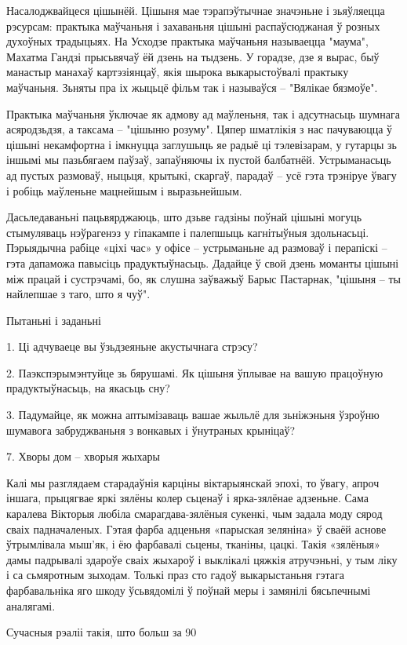 Насалоджвайцеся цішынёй. Цішыня мае тэрапэўтычнае значэньне і зьяўляецца рэсурсам: практыка маўчаньня і захаваньня цішыні распаўсюджаная ў розных духоўных традыцыях. На Усходзе практыка маўчаньня называецца "маума", Махатма Гандзі прысьвячаў ёй дзень на тыдзень. У горадзе, дзе я вырас, быў манастыр манахаў картэзіянцаў, якія шырока выкарыстоўвалі практыку маўчаньня. Зьняты пра іх жыцьцё фільм так і называўся – "Вялікае бязмоўе".

Практыка маўчаньня ўключае як адмову ад маўленьня, так і адсутнасьць шумнага асяродзьдзя, а таксама – "цішыню розуму". Цяпер шматлікія з нас пачуваюцца ў цішыні некамфортна і імкнуцца заглушыць яе радыё ці тэлевізарам, у гутарцы зь іншымі мы пазьбягаем паўзаў, запаўняючы іх пустой балбатнёй. Устрыманасьць ад пустых размоваў, ныцьця, крытыкі, скаргаў, парадаў – усё гэта трэніруе ўвагу і робіць маўленьне мацнейшым і выразьнейшым.

Дасьледаваньні пацьвярджаюць, што дзьве гадзіны поўнай цішыні могуць стымуляваць нэўрагенэз у гіпакампе і палепшыць кагнітыўныя здольнасьці. Пэрыядычна рабіце «ціхі час» у офісе – устрыманьне ад размоваў і перапіскі – гэта дапаможа павысіць прадуктыўнасьць. Дадайце ў свой дзень моманты цішыні між працай і сустрэчамі, бо, як слушна заўважыў Барыс Пастарнак, "цішыня – ты найлепшае з таго, што я чуў".

Пытаньні і заданьні

1. Ці адчуваеце вы ўзьдзеяньне акустычнага стрэсу?

2. Паэкспэрымэнтуйце зь бярушамі. Як цішыня ўплывае на вашую працоўную прадуктыўнасьць, на якасьць сну?

3. Падумайце, як можна аптымізаваць вашае жыльлё для зьніжэньня ўзроўню шумавога забруджваньня з вонкавых і ўнутраных крыніцаў?


7. Хворы дом – хворыя жыхары

Калі мы разглядаем старадаўнія карціны віктарыянскай эпохі, то ўвагу, апроч іншага, прыцягвае яркі зялёны колер сьценаў і ярка-зялёнае адзеньне. Сама каралева Вікторыя любіла смарагдава-зялёныя сукенкі, чым задала моду сярод сваіх падначаленых. Гэтая фарба адценьня «парыская зеляніна» ў сваёй аснове ўтрымлівала мыш'як, і ёю фарбавалі сьцены, тканіны, цацкі. Такія «зялёныя» дамы падрывалі здароўе сваіх жыхароў і выклікалі цяжкія атручэньні, у тым ліку і са сьмяротным зыходам. Толькі праз сто гадоў выкарыстаньня гэтага фарбавальніка яго шкоду ўсьвядомілі ў поўнай меры і замянілі бясьпечнымі аналягамі.

Сучасныя рэаліі такія, што больш за 90%

